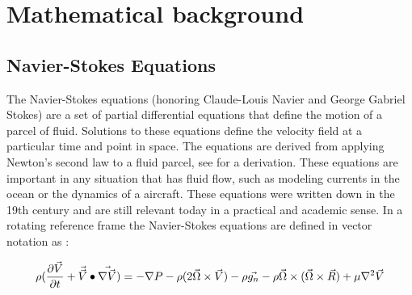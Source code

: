 \newcommand{\CROSS}[2]{ \vec{#1} \times \vec{#2} }
\newcommand{\DOT}[2]{\vec{#1} \bullet \vec{#2}}
\newcommand{\GRAD}[1]{\nabla #1}
\newcommand{\LAP}[1]{\nabla^2 #1}
\newcommand{\CORIOLIS}[1]{2\CROSS{\Omega}{#1}}
\newcommand{\CENTRIFUGAL}[1]{\vec{\Omega} \times (\CROSS{\Omega}{#1})}


\renewcommand{\arraystretch}{1.05} %


\chapter{Mathematical background}
\label{math_chapter}
\section{Navier-Stokes Equations}
The Navier-Stokes equations  (honoring Claude-Louis Navier and George Gabriel Stokes) are a set of partial differential equations that define the motion of a parcel of fluid. 
Solutions to these equations define the velocity field at a particular time and point in space. The equations are derived from applying Newton's second law to a fluid parcel, see \citep{kundu_cohen} for a derivation. These equations are important in any situation that has fluid flow, such as modeling currents in the ocean or the dynamics of a aircraft. These equations were written down in the 19th century and are still relevant today in a practical and academic sense. In a rotating reference frame the Navier-Stokes equations are defined in vector notation as : 

\begin{equation} 
	 \rho(\dtp{\vec{V}} +\DOT{\vec{V}}{\nabla \vec{V}})= -\GRAD{P}  -\rho(\CORIOLIS{V}) - \rho\vec{g_n} -\rho\CENTRIFUGAL{R}+  \mu \LAP{\vec{V}} 
\end{equation} 


